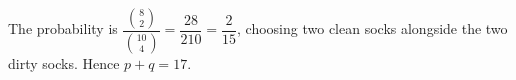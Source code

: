 The probability is $\dfrac{\binom82}{\binom{10}4}=\dfrac{28}{210}=\dfrac{2}{15}$, choosing two clean socks alongside the two dirty socks. Hence $p+q=\boxed{17}$.

